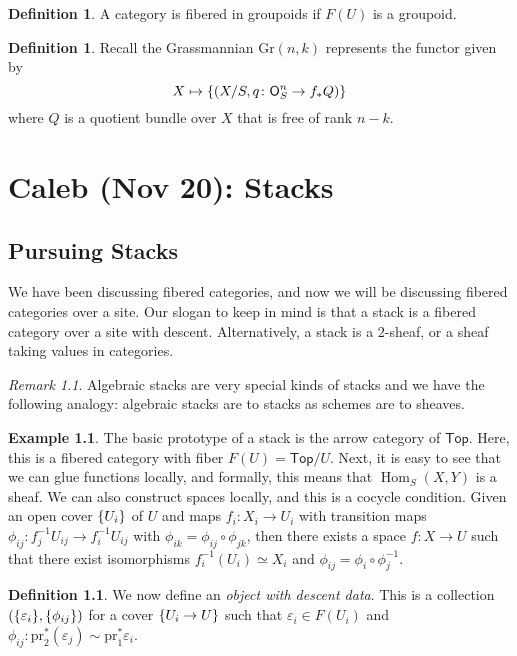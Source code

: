 \documentclass[leqno, openany]{memoir}
\theoremstyle{definition}
\newtheorem{defn}[thm]{Definition}
\newtheorem{exm}[thm]{Example}
\theoremstyle{remark}
\newtheorem{rmk}[thm]{Remark}
\theoremstyle{plain}
\theoremstyle{definition}
\theoremstyle{remark}
\newcommand{\ep}{\varepsilon}
\newcommand{\mr}[1]{\mathrm{#1}}
\newcommand{\ms}[1]{\mathsf{#1}}
\DeclareMathOperator{\Hom}{Hom}
\begin{document}
\begin{defn}
    A category is fibered in groupoids if $F(U)$ is a groupoid.
\end{defn}

\begin{defn}
    Recall the Grassmannian $\mr{Gr}(n,k)$ represents the functor given by 
    \[ X \mapsto \qty{(X/S, q \colon \ms{O}_S^n \to f_* Q)}\] 
    where $Q$ is a quotient bundle over $X$ that is free of rank $n-k$.
\end{defn}

\chapter{Caleb (Nov 20): Stacks}%
\label{cha:caleb_nov_20_stacks_and_hooks}

\section{Pursuing Stacks}%
\label{sec:pursuing_stacks}

We have been discussing fibered categories, and now we will be discussing fibered categories over a site. Our slogan to keep in mind is that a stack is a fibered category over a site with descent. Alternatively, a stack is a $2$-sheaf, or a sheaf taking values in categories.

\begin{rmk}
    Algebraic stacks are very special kinds of stacks and we have the following analogy: algebraic stacks are to stacks as schemes are to sheaves.
\end{rmk}

\begin{exm}
    The basic prototype of a stack is the arrow category of $\ms{Top}$. Here, this is a fibered category with fiber $F(U) = \ms{Top}/U$. Next, it is easy to see that we can glue functions locally, and formally, this means that $\Hom_S(X,Y)$ is a sheaf. We can also construct spaces locally, and this is a cocycle condition. Given an open cover $\qty{U_i}$ of $U$ and maps $f_i \colon X_i \to U_i$ with transition maps $\phi_{ij} \colon f_j^{-1} U_{ij} \to f_i^{-1} U_{ij}$ with $\phi_{ik} = \phi_{ij} \circ \phi_{jk}$, then there exists a space $f \colon X \to U$ such that there exist isomorphisms $f_i^{-1}(U_i) \simeq X_i$ and $\phi_{ij} = \phi_i \circ \phi_j^{-1}$.
\end{exm}

\begin{defn}
    We now define an \textit{object with descent data}. This is a collection $(\qty{\ep_i}, \qty{\phi_{ij}})$ for a cover $\qty{U_i \to U}$ such that $\ep_i \in F(U_i)$ and $\phi_{ij} \colon \mr{pr}_2^*(\ep_j) \sim \mr{pr}_1^* \ep_i$.
\end{defn}
\end{document}
